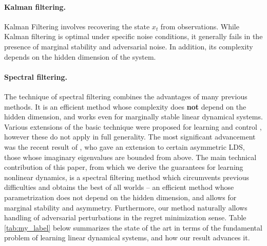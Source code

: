 \documentclass[11pt]{article}
\numberwithin{equation}{section}
\begin{document}
\paragraph{Kalman filtering.}
Kalman Filtering \cite{kalman1960new,anderson1991kalman} involves recovering the state $x_t$ from observations. While Kalman filtering is optimal under specific noise conditions, it generally fails in the presence of marginal stability and adversarial noise. In addition, its complexity depends on the hidden dimension of the system.    



\paragraph{Spectral filtering.}
The technique of spectral filtering \cite{hazan2017learning} combines the advantages of many previous methods. It is an efficient method whose complexity does {\bf not} depend on the hidden dimension, and works even for marginally stable linear dynamical systems.  Various extensions of the basic technique were proposed for learning and control \cite{hazan2018spectral,arora2018towards,brahmbhatt2025newapproachcontrollinglinear}, however these do not apply in full generality. The most significant advancement was the recent result of   \cite{marsden2025universalsequencepreconditioning}, who gave an extension to certain asymmetric LDS, those whose imaginary eigenvalues are bounded from above. 
\newline \newline
The main technical contribution of this paper, from which we derive the guarantees for learning nonlinear dynamics, is a spectral filtering method which circumvents previous difficulties and obtains the best of all worlds -- an efficient method whose parametrization does not depend on the hidden dimension, and allows for marginal stability and asymmetry.  Furthermore, our method naturally allows handling of adversarial perturbations in the regret minimization sense. 
Table \ref{tab:my_label} below summarizes the state of the art in terms of the fundamental problem of learning linear dynamical systems, and how our result advances it. 
\end{document}
